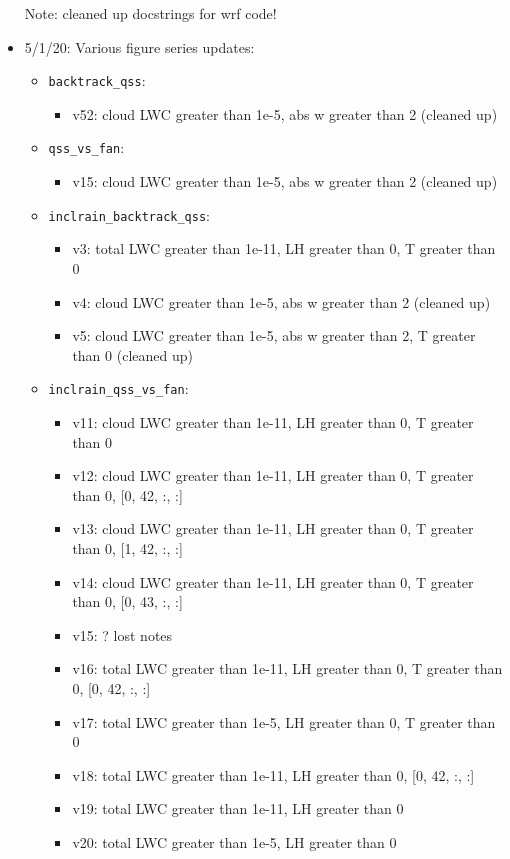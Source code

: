 \documentclass{article}
\begin{document}
\begin{itemize}
	\noindent Note: cleaned up docstrings for wrf code!
	\item 5/1/20: Various figure series updates:
	\begin{itemize}
		\item \texttt{backtrack\_qss}:
		\begin{itemize}
			\item v52: cloud LWC greater than 1e-5, abs w greater than 2 (cleaned up)
		\end{itemize}
		\item \texttt{qss\_vs\_fan}:
		\begin{itemize}
			\item v15: cloud LWC greater than 1e-5, abs w greater than 2 (cleaned up)
		\end{itemize}
		\item \texttt{inclrain\_backtrack\_qss}:
		\begin{itemize}
			\item v3: total LWC greater than 1e-11, LH greater than 0, T greater than 0
			\item v4: cloud LWC greater than 1e-5, abs w greater than 2 (cleaned up)
			\item v5: cloud LWC greater than 1e-5, abs w greater than 2, T greater than 0 (cleaned up)
		\end{itemize}
		\item \texttt{inclrain\_qss\_vs\_fan}:
		\begin{itemize}
			\item v11: cloud LWC greater than 1e-11, LH greater than 0, T greater than 0
			\item v12: cloud LWC greater than 1e-11, LH greater than 0, T greater than 0, [0, 42, :, :]
			\item v13: cloud LWC greater than 1e-11, LH greater than 0, T greater than 0, [1, 42, :, :]
			\item v14: cloud LWC greater than 1e-11, LH greater than 0, T greater than 0, [0, 43, :, :]
			\item v15: ? lost notes 
			\item v16: total LWC greater than 1e-11, LH greater than 0, T greater than 0, [0, 42, :, :]
			\item v17: total LWC greater than 1e-5, LH greater than 0, T greater than 0
			\item v18: total LWC greater than 1e-11, LH greater than 0, [0, 42, :, :]
			\item v19: total LWC greater than 1e-11, LH greater than 0
			\item v20: total LWC greater than 1e-5, LH greater than 0

\end{itemize}
\end{itemize}
\end{itemize}
\end{document}
